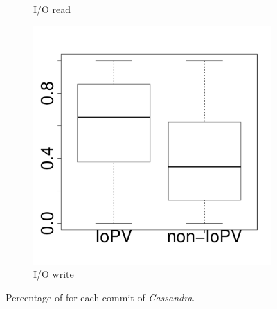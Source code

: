 \begin{figure}[t]
\begin{subfigure}{0.19\textwidth}
                \caption{I/O read}
        \end{subfigure}
        \begin{subfigure}{0.19\textwidth}
                \includegraphics[width=\linewidth]{Figures/iowrite-cassandra-boxplot.pdf}
                \caption{I/O write}
        \end{subfigure}
        
	\caption{Percentage of \inconsistent for each commit of \emph{Cassandra}. }
	\label{fig:iopv_per_commit_cassandra}
\end{figure}


